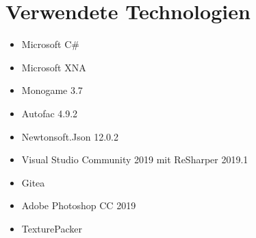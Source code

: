 \section{Verwendete Technologien}


\begin{itemize}[leftmargin=*, nosep]
    \item Microsoft C\#
    \item Microsoft XNA
    \item Monogame 3.7
    \item Autofac 4.9.2
    \item Newtonsoft.Json 12.0.2
    \item Visual Studio Community 2019 mit ReSharper 2019.1
    \item Gitea
    \item Adobe Photoshop CC 2019
    \item TexturePacker
\end{itemize}
